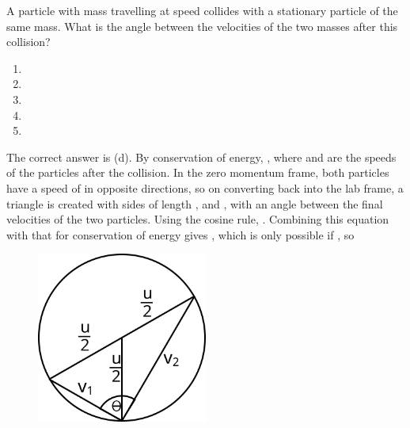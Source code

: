 
\begin{problem} 
{A particle with mass  travelling at speed   collides with a stationary particle of the same mass. What is the angle between the velocities of the two masses after this collision?
\begin{enumerate}
	\item {}
	\item {}
	\item {}
	\item {} \answer
	\item {}
\end{enumerate}
}
{}
{The correct answer is (d). By conservation of energy, , where  and  are the speeds of the particles after the collision. In the zero momentum frame, both particles have a speed of  in opposite directions, so on converting back into the lab frame, a triangle is created with sides of length  ,   and  , with an angle \vari{\theta} between the final velocities of the two particles. Using the cosine rule, . Combining this equation with that for conservation of energy gives , which is only possible if , so 

\begin{figure}[h]
	\centering
	\includegraphics[width=0.5\textwidth]{../../../figures/dynamics_angle_between_identical_masses.svg}
	\caption{}\label{fig:Dynamics_angle_between_identical_masses}
\end{figure}
}
\end{problem}